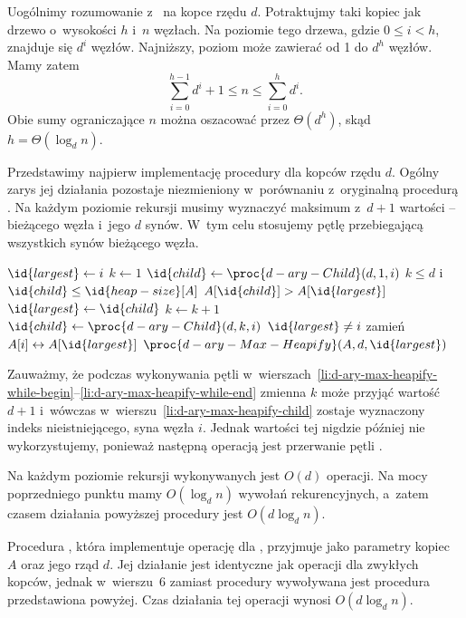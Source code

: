\subproblem %
Uogólnimy rozumowanie z~ na kopce rzędu $d$. Potraktujmy taki kopiec jak drzewo  o~wysokości $h$ i~$n$ węzłach. Na  poziomie tego drzewa, gdzie $0\le i<h$, znajduje się $d^i$ węzłów. Najniższy,  poziom może zawierać od 1 do $d^h$ węzłów. Mamy zatem
\[
    \sum_{i=0}^{h-1}d^i+1 \le n \le \sum_{i=0}^hd^i.
\]
Obie sumy ograniczające $n$ można oszacować przez $\Theta(d^h)$, skąd $h=\Theta(\log_dn)$.

\subproblem %
Przedstawimy najpierw implementację procedury  dla kopców rzędu $d$. Ogólny zarys jej działania pozostaje niezmieniony w~porównaniu z~oryginalną procedurą . Na każdym poziomie rekursji musimy wyznaczyć maksimum z~$d+1$ wartości -- bieżącego węzła i~jego $d$ synów. W~tym celu stosujemy pętlę przebiegającą wszystkich synów bieżącego węzła.
\begin{codebox}
\li	$\id{largest}\gets i$
\li	$k\gets1$
\li	$\id{child}\gets\proc{d-ary-Child}(d,1,i)$
\li	\While $k\le d$ i~$\id{child}\le\id{heap-size}[A]$ \label{li:d-ary-max-heapify-while-begin}
\li		\Do
			\If $A[\id{child}]>A[\id{largest}]$
\li				\Then $\id{largest}\gets\id{child}$
				\End
\li			$k\gets k+1$
\li			$\id{child}\gets\proc{d-ary-Child}(d,k,i)$ \label{li:d-ary-max-heapify-child}
		\End \label{li:d-ary-max-heapify-while-end}
\li	\If $\id{largest}\ne i$
\li		\Then
			zamień $A[i]\leftrightarrow A[\id{largest}]$
\li			$\proc{d-ary-Max-Heapify}(A,d,\id{largest})$
		\End
\end{codebox}
Zauważmy, że podczas wykonywania pętli  w~wierszach~\ref{li:d-ary-max-heapify-while-begin}--\ref{li:d-ary-max-heapify-while-end} zmienna $k$ może przyjąć wartość $d+1$ i~wówczas w~wierszu~\ref{li:d-ary-max-heapify-child} zostaje wyznaczony indeks nieistniejącego,  syna węzła $i$. Jednak wartości tej nigdzie później nie wykorzystujemy, ponieważ następną operacją jest przerwanie pętli .

Na każdym poziomie rekursji wykonywanych jest $O(d)$ operacji. Na mocy poprzedniego punktu mamy $O(\log_dn)$ wywołań rekurencyjnych, a~zatem czasem działania powyższej procedury jest $O(d\log_dn)$.

Procedura , która implementuje operację  dla , przyjmuje jako parametry kopiec $A$ oraz jego rząd $d$. Jej działanie jest identyczne jak operacji  dla zwykłych kopców, jednak w~wierszu~6 zamiast procedury  wywoływana jest procedura  przedstawiona powyżej. Czas działania tej operacji wynosi $O(d\log_dn)$.

